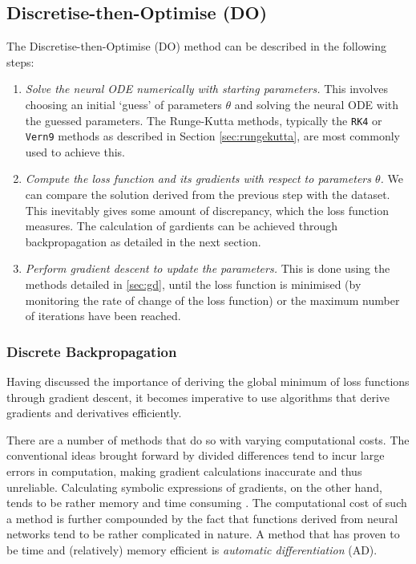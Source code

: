 \documentclass[a4paper,11pt,titlepage]{article}
\theoremstyle{definition}
\theoremstyle{plain}
\theoremstyle{remark}
\begin{document}
\subsection{Discretise-then-Optimise (DO)}
\label{sec:do}

The Discretise-then-Optimise (DO) method can be described in the following steps:
\begin{enumerate}
    \item \textit{Solve the neural ODE numerically with starting parameters.} This involves choosing an initial ‘guess’ of parameters $\theta$ and solving the neural ODE with the guessed parameters. The Runge-Kutta methods, typically the \texttt{RK4} or \texttt{Vern9} methods as described in Section \ref{sec:rungekutta}, are most commonly used to achieve this.
    \item \textit{Compute the loss function and its gradients with respect to parameters $\theta$.} We can compare the solution derived from the previous step with the dataset. This inevitably gives some amount of discrepancy, which the loss function measures. The calculation of gardients can be achieved through backpropagation as detailed in the next section.
    \item \textit{Perform gradient descent to update the parameters.} This is done using the methods detailed in \ref{sec:gd}, until the loss function is minimised (by monitoring the rate of change of the loss function) or the maximum number of iterations have been reached.
\end{enumerate}

\subsubsection{Discrete Backpropagation}
\label{sec:ad}

Having discussed the importance of deriving the global minimum of loss functions through gradient descent, it becomes imperative to use algorithms that derive gradients and derivatives efficiently.

There are a number of methods that do so with varying computational costs. The conventional ideas brought forward by divided differences tend to incur large errors in computation, making gradient calculations inaccurate and thus unreliable. Calculating symbolic expressions of gradients, on the other hand, tends to be rather memory and time consuming \cite{tucker2011}. The computational cost of such a method is further compounded by the fact that functions derived from neural networks tend to be rather complicated in nature. A method that has proven to be time and (relatively) memory efficient is \textit{automatic differentiation} (AD).
\end{document}

